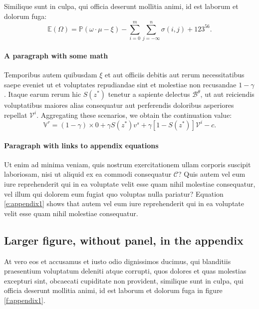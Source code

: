 \documentclass[letterpaper,11pt,leqno]{article}
\begin{document}
\begin{corollary} Similique sunt in culpa, qui officia deserunt mollitia animi, id est laborum et dolorum fuga:
\begin{equation*}
\mathbb{E}(\Omega) = \mathbb{P}(\omega\cdot \mu - \xi) - \sum_{i=0}^{m}\sum_{j=-\infty}^{n} \sigma(i,j) + 123^{56}.
\end{equation*}\end{corollary}

\paragraph{A paragraph with some math} Temporibus autem quibusdam $\xi$ et aut officiis debitis aut rerum necessitatibus saepe eveniet ut et voluptates repudiandae sint et molestiae non recusandae $1-\gamma$. Itaque earum rerum hic $S(z^*)$ tenetur a sapiente delectus $\mathcal{B}^\theta$, ut aut reiciendis voluptatibus maiores alias consequatur aut perferendis doloribus asperiores repellat $\mathcal{V}^i$. Aggregating these scenarios, we obtain the continuation value:
\begin{equation}
\mathbb{V}^r = (1-\gamma) \times 0 +\gamma S(z^*) v^s+\gamma [1-S(z^*)] \mathcal{V}^i-c.
\label{e:appendix1}\end{equation}

\paragraph{Paragraph with links to appendix equations} Ut enim ad minima veniam, quis nostrum exercitationem ullam corporis suscipit laboriosam, nisi ut aliquid ex ea commodi consequatur $\mathcal{C}$? Quis autem vel eum iure reprehenderit qui in ea voluptate velit esse quam nihil molestiae consequatur, vel illum qui dolorem eum fugiat quo voluptas nulla pariatur? Equation \eqref{e:appendix1} shows that autem vel eum iure reprehenderit qui in ea voluptate velit esse quam nihil molestiae consequatur.

\subsection{Larger figure, without panel, in the appendix} 

At vero eos et accusamus et iusto odio dignissimos ducimus, qui blanditiis praesentium voluptatum deleniti atque corrupti, quos dolores et quas molestias excepturi sint, obcaecati cupiditate non provident, similique sunt in culpa, qui officia deserunt mollitia animi, id est laborum et dolorum fuga in figure \ref{f:appendix1}.
\end{document}
